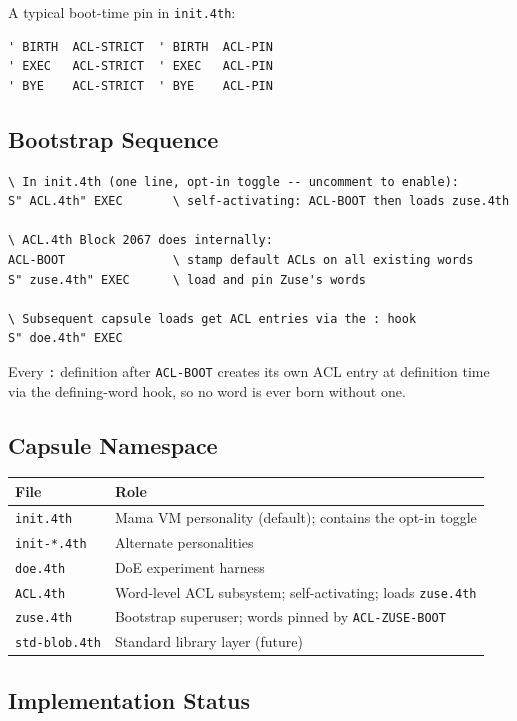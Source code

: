 A typical boot-time pin in \texttt{init.4th}:

\begin{lstlisting}[language=Forth]
' BIRTH  ACL-STRICT  ' BIRTH  ACL-PIN
' EXEC   ACL-STRICT  ' EXEC   ACL-PIN
' BYE    ACL-STRICT  ' BYE    ACL-PIN
\end{lstlisting}

\subsection{Bootstrap Sequence}

\begin{lstlisting}[language=Forth]
\ In init.4th (one line, opt-in toggle -- uncomment to enable):
S" ACL.4th" EXEC       \ self-activating: ACL-BOOT then loads zuse.4th

\ ACL.4th Block 2067 does internally:
ACL-BOOT               \ stamp default ACLs on all existing words
S" zuse.4th" EXEC      \ load and pin Zuse's words

\ Subsequent capsule loads get ACL entries via the : hook
S" doe.4th" EXEC
\end{lstlisting}

Every \texttt{:} definition after \texttt{ACL-BOOT} creates its own ACL entry at
definition time via the defining-word hook, so no word is ever born without one.

\subsection{Capsule Namespace}

\begin{tabular}{ll}
\toprule
File & Role \\
\midrule
\texttt{init.4th} & Mama VM personality (default); contains the opt-in toggle \\
\texttt{init-*.4th} & Alternate personalities \\
\texttt{doe.4th} & DoE experiment harness \\
\texttt{ACL.4th} & Word-level ACL subsystem; self-activating; loads \texttt{zuse.4th} \\
\texttt{zuse.4th} & Bootstrap superuser; words pinned by \texttt{ACL-ZUSE-BOOT} \\
\texttt{std-blob.4th} & Standard library layer (future) \\
\bottomrule
\end{tabular}

\subsection{Implementation Status}

